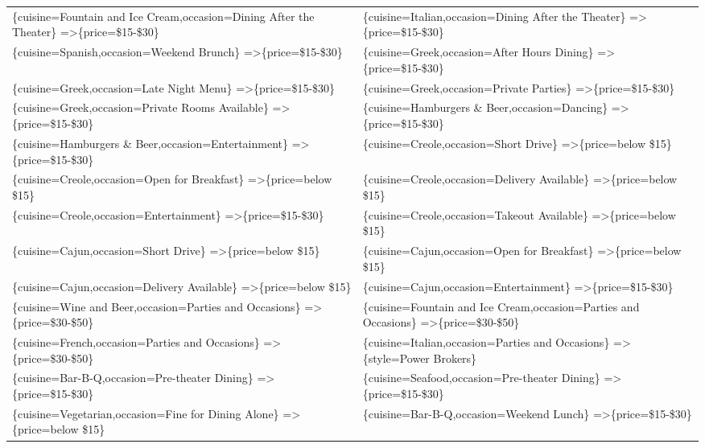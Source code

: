 \documentclass[letterpaper,10pt]{article}
\begin{document}
\begin{appendices}
\begin{table}[h]
\begin{adjustbox}{max width=\textwidth}
\begin{tabular}{ll}
\{cuisine=Fountain and Ice Cream,occasion=Dining After the Theater\} =\textgreater \{price=\$15-\$30\} & \{cuisine=Italian,occasion=Dining After the Theater\} =\textgreater \{price=\$15-\$30\} \\ 
\{cuisine=Spanish,occasion=Weekend Brunch\} =\textgreater \{price=\$15-\$30\} & \{cuisine=Greek,occasion=After Hours Dining\} =\textgreater \{price=\$15-\$30\} \\ 
\{cuisine=Greek,occasion=Late Night Menu\} =\textgreater \{price=\$15-\$30\} & \{cuisine=Greek,occasion=Private Parties\} =\textgreater \{price=\$15-\$30\} \\ 
\{cuisine=Greek,occasion=Private Rooms Available\} =\textgreater \{price=\$15-\$30\} & \{cuisine=Hamburgers \& Beer,occasion=Dancing\} =\textgreater \{price=\$15-\$30\} \\ 
\{cuisine=Hamburgers \& Beer,occasion=Entertainment\} =\textgreater \{price=\$15-\$30\} & \{cuisine=Creole,occasion=Short Drive\} =\textgreater \{price=below \$15\} \\ 
\{cuisine=Creole,occasion=Open for Breakfast\} =\textgreater \{price=below \$15\} & \{cuisine=Creole,occasion=Delivery Available\} =\textgreater \{price=below \$15\} \\ 
\{cuisine=Creole,occasion=Entertainment\} =\textgreater \{price=\$15-\$30\} & \{cuisine=Creole,occasion=Takeout Available\} =\textgreater \{price=below \$15\} \\ 
\{cuisine=Cajun,occasion=Short Drive\} =\textgreater \{price=below \$15\} & \{cuisine=Cajun,occasion=Open for Breakfast\} =\textgreater \{price=below \$15\} \\ 
\{cuisine=Cajun,occasion=Delivery Available\} =\textgreater \{price=below \$15\} & \{cuisine=Cajun,occasion=Entertainment\} =\textgreater \{price=\$15-\$30\} \\ 
\{cuisine=Wine and Beer,occasion=Parties and Occasions\} =\textgreater \{price=\$30-\$50\} & \{cuisine=Fountain and Ice Cream,occasion=Parties and Occasions\} =\textgreater \{price=\$30-\$50\} \\ 
\{cuisine=French,occasion=Parties and Occasions\} =\textgreater \{price=\$30-\$50\} & \{cuisine=Italian,occasion=Parties and Occasions\} =\textgreater \{style=Power Brokers\} \\ 
\{cuisine=Bar-B-Q,occasion=Pre-theater Dining\} =\textgreater \{price=\$15-\$30\} & \{cuisine=Seafood,occasion=Pre-theater Dining\} =\textgreater \{price=\$15-\$30\} \\ 
\{cuisine=Vegetarian,occasion=Fine for Dining Alone\} =\textgreater \{price=below \$15\} & \{cuisine=Bar-B-Q,occasion=Weekend Lunch\} =\textgreater \{price=\$15-\$30\} \\ 

\end{tabular}
\end{adjustbox}
\end{table}
\end{appendices}
\end{document}
